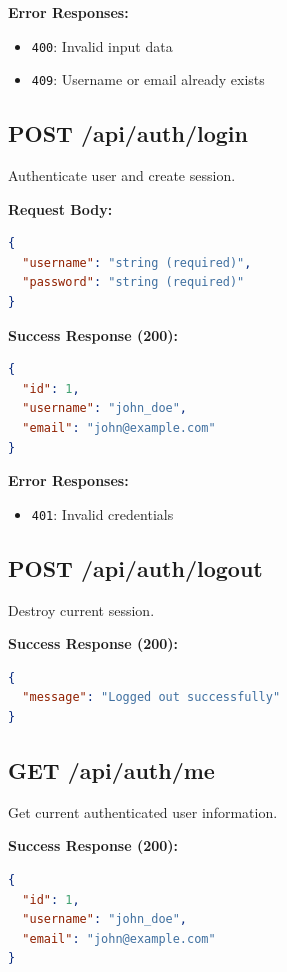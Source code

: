 \textbf{Error Responses:}
\begin{itemize}
    \item \texttt{400}: Invalid input data
    \item \texttt{409}: Username or email already exists
\end{itemize}

\subsection{POST /api/auth/login}

Authenticate user and create session.

\textbf{Request Body:}
\begin{lstlisting}[language=JSON]
{
  "username": "string (required)",
  "password": "string (required)"
}
\end{lstlisting}

\textbf{Success Response (200):}
\begin{lstlisting}[language=JSON]
{
  "id": 1,
  "username": "john_doe",
  "email": "john@example.com"
}
\end{lstlisting}

\textbf{Error Responses:}
\begin{itemize}
    \item \texttt{401}: Invalid credentials
\end{itemize}

\subsection{POST /api/auth/logout}

Destroy current session.

\textbf{Success Response (200):}
\begin{lstlisting}[language=JSON]
{
  "message": "Logged out successfully"
}
\end{lstlisting}

\subsection{GET /api/auth/me}

Get current authenticated user information.

\textbf{Success Response (200):}
\begin{lstlisting}[language=JSON]
{
  "id": 1,
  "username": "john_doe",
  "email": "john@example.com"
}
\end{lstlisting}

